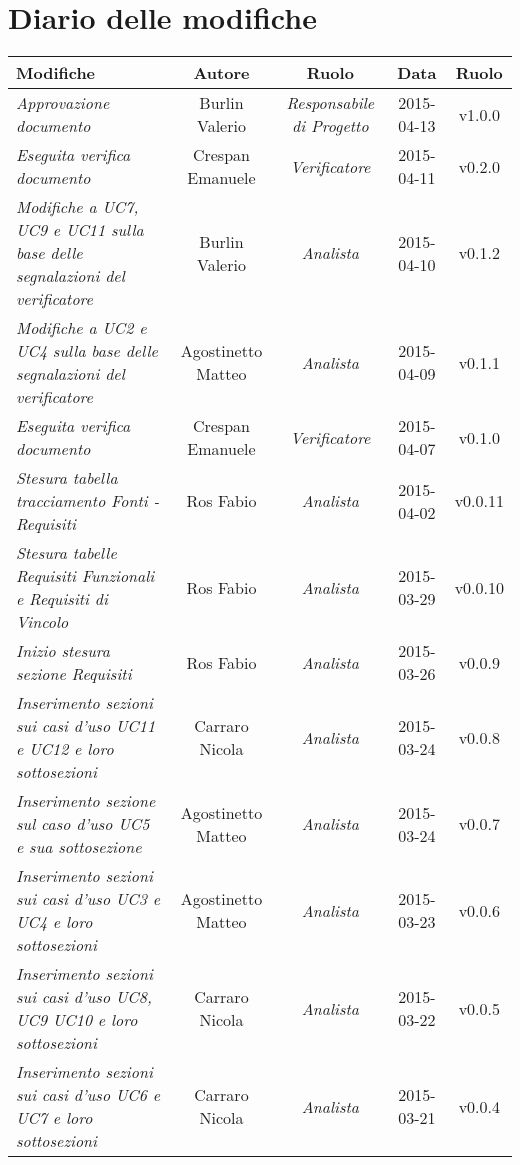 \newpage
\section*{Diario delle modifiche}

\begin{table}[h]
\centering
\begin{tabular}{|p{}|c|c|c|c|}
	\toprule
		\textbf{Modifiche} & \textbf{Autore} & \textbf{Ruolo} & \textbf{Data} & \textbf{Ruolo} \\
	\midrule
	\midrule
		\textit{Approvazione documento} & Burlin Valerio & \textit{Responsabile di Progetto} & 2015-04-13 & v1.0.0 \\
	\midrule
		\textit{Eseguita verifica documento} & Crespan Emanuele & \textit{Verificatore} & 2015-04-11 & v0.2.0 \\
	\midrule
		\textit{Modifiche a UC7, UC9 e UC11 sulla base delle segnalazioni del verificatore} & Burlin Valerio & \textit{Analista} & 2015-04-10 & v0.1.2 \\
    \midrule
	    \textit{Modifiche a UC2 e UC4 sulla base delle segnalazioni del verificatore} & Agostinetto Matteo & \textit{Analista} & 2015-04-09 & v0.1.1 \\
	\midrule
		\textit{Eseguita verifica documento} & Crespan Emanuele & \textit{Verificatore} & 2015-04-07 & v0.1.0 \\
	\midrule
		\textit{Stesura tabella tracciamento Fonti - Requisiti} & Ros Fabio & \textit{Analista} & 2015-04-02 & v0.0.11 \\
	\midrule
		\textit{Stesura tabelle Requisiti Funzionali e Requisiti di Vincolo } & Ros Fabio & \textit{Analista} & 2015-03-29 & v0.0.10 \\
	\midrule
		\textit{Inizio stesura sezione Requisiti} & Ros Fabio & \textit{Analista} & 2015-03-26 & v0.0.9 \\
	\midrule
		\textit{Inserimento sezioni sui casi d'uso UC11 e UC12 e loro sottosezioni} & Carraro Nicola & \textit{Analista} & 2015-03-24 & v0.0.8 \\
	\midrule
		\textit{Inserimento sezione sul caso d'uso UC5 e sua sottosezione} & Agostinetto Matteo & \textit{Analista} & 2015-03-24 & v0.0.7 \\
	\midrule
		\textit{Inserimento sezioni sui casi d'uso UC3 e UC4 e loro sottosezioni} & Agostinetto Matteo & \textit{Analista} & 2015-03-23 & v0.0.6 \\
	\midrule
		\textit{Inserimento sezioni sui casi d'uso UC8, UC9 UC10 e loro sottosezioni} & Carraro Nicola & \textit{Analista} & 2015-03-22 & v0.0.5 \\
	\midrule
		\textit{Inserimento sezioni sui casi d'uso UC6 e UC7 e loro sottosezioni} & Carraro Nicola & \textit{Analista} & 2015-03-21 & v0.0.4 \\
	\bottomrule
\end{tabular}	
\end{table}
